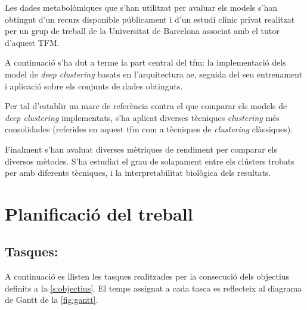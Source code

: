 \documentclass[CAT,BIB]{TFUOC}%
\begin{document}
        Les dades metabolòmiques que s’han utilitzat per avaluar els models
        s'han obtingut d'un recurs disponible públicament
        i d'un estudi clínic privat
        realitzat per un grup de treball de la Universitat de Barcelona
        associat amb el tutor d’aquest TFM.

        A continuació s'ha dut a terme la part central del \gls{tfm}:
        la implementació dels model de \textit{deep clustering}
        basats en l'arquitectura \gls{ae},
        seguida del seu entrenament i aplicació
        sobre els conjunts de dades obtinguts.

        Per tal d’establir un marc de referència
        contra el que comparar els models de \textit{deep clustering} implementats,
        s'ha aplicat diverses tècniques \textit{clustering} més consolidades
        (referides en aquest \gls{tfm} com a tècniques de \textit{clustering} clàssiques).

        Finalment s'han avaluat diverses mètriques de rendiment
        per comparar els diversos mètodes.
        S'ha estudiat el grau de solapament entre els clústers trobats per amb diferents tècniques,
        i la interpretabilitat biològica dels resultats.

    \section{Planificació del treball}
    \label{s:planificacio}

        \subsection{Tasques:}
        \label{s:tasques}

            A continuació es llisten les tasques realitzades
            per la consecució dels objectius definits a la \cref{s:objectius}.
            El temps assignat a cada tasca
            es reflecteix al diagrama de Gantt de la \cref{fig:gantt}.
\end{document}
